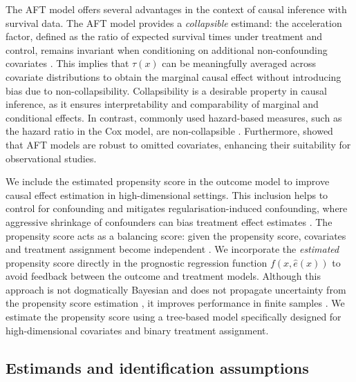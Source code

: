 The AFT model offers several advantages in the context of causal inference with survival data. 
The AFT model provides a \textit{collapsible} estimand: the acceleration factor, defined as the ratio of expected survival times under treatment and control, remains invariant when conditioning on additional non-confounding covariates \citep{Robins1992AFT, Aalen2015CoxCausal, Crowther2023}.
This implies that $\tau(x)$ can be meaningfully averaged across covariate distributions to obtain the marginal causal effect without introducing bias due to non-collapsibility.
Collapsibility is a desirable property in causal inference, as it ensures interpretability and comparability of marginal and conditional effects. 
In contrast, commonly used hazard-based measures, such as the hazard ratio in the Cox model, are non-collapsible \citep{Hernan2010, Martinussen2013, Aalen2015CoxCausal}.
Furthermore, \cite{Hougaard1999} showed that AFT models are robust to omitted covariates, enhancing their suitability for observational studies.

We include the estimated propensity score in the outcome model to improve causal effect estimation in high-dimensional settings. 
This inclusion helps to control for confounding and mitigates regularisation-induced confounding, where aggressive shrinkage of confounders can bias treatment effect estimates \citep{hahn2020bayesian, Ray2020SemiparametricBayes}. 
The propensity score acts as a balancing score: given the propensity score, covariates and treatment assignment become independent \citep{RosenbaumRubin1983}. 
We incorporate the \textit{estimated} propensity score directly in the prognostic regression function $f(x, \hat{e}(x))$ to avoid feedback between the outcome and treatment models.
Although this approach is not dogmatically Bayesian and does not propagate uncertainty from the propensity score estimation \citep{Zigler2013ModelFeedback}, it improves performance in finite samples \citep{hahn2020bayesian}. 
We estimate the propensity score using a tree-based model specifically designed for high-dimensional covariates and binary treatment assignment.



\subsection{Estimands and identification assumptions}

